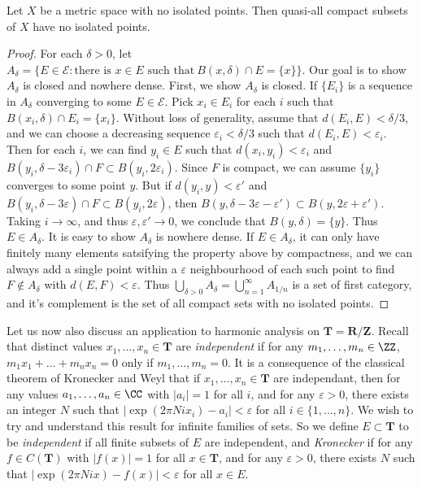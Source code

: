 \begin{theorem}
	Let $X$ be a metric space with no isolated points. Then quasi-all compact subsets of $X$ have no isolated points.
\end{theorem}
\begin{proof}
	For each $\delta > 0$, let $A_\delta = \{ E \in \mathcal{E}: \text{there is $x \in E$ such that}\ B(x,\delta) \cap E = \{ x \} \}$. Our goal is to show $A_\delta$ is closed and nowhere dense. First, we show $A_\delta$ is closed. If $\{ E_i \}$ is a sequence in $A_\delta$ converging to some $E \in \mathcal{E}$. Pick $x_i \in E_i$ for each $i$ such that $B(x_i,\delta) \cap E_i = \{ x_i \}$. Without loss of generality, assume that $d(E_i, E) < \delta / 3$, and we can choose a decreasing sequence $\varepsilon_i < \delta / 3$ such that $d(E_i,E) < \varepsilon_i$. Then for each $i$, we can find $y_i \in E$ such that $d(x_i,y_i) < \varepsilon_i$ and $B(y_i,\delta - 3 \varepsilon_i) \cap F \subset B(y_i,2\varepsilon_i)$. Since $F$ is compact, we can assume $\{ y_i \}$ converges to some point $y$. But if $d(y_i,y) < \varepsilon'$ and $B(y_i,\delta - 3\varepsilon) \cap F \subset B(y_i,2\varepsilon)$, then $B(y,\delta-3\varepsilon - \varepsilon') \subset B(y,2\varepsilon + \varepsilon')$. Taking $i \to \infty$, and thus $\varepsilon, \varepsilon' \to 0$, we conclude that $B(y,\delta) = \{ y \}$. Thus $E \in A_\delta$. It is easy to show $A_\delta$ is nowhere dense. If $E \in A_\delta$, it can only have finitely many elements satsifying the property above by compactness, and we can always add a single point within a $\varepsilon$ neighbourhood of each such point to find $F \not \in A_\delta$ with $d(E,F) < \varepsilon$. Thus $\bigcup_{\delta > 0} A_\delta = \bigcup_{n = 1}^\infty A_{1/n}$ is a set of first category, and it's complement is the set of all compact sets with no isolated points.
\end{proof}

Let us now also discuss an application to harmonic analysis on $\mathbf{T} = \mathbf{R}/\mathbf{Z}$. Recall that distinct values $x_1, \dots, x_n \in \mathbf{T}$ are \emph{independent} if for any $m_1, \dots, m_n \in \ZZ$, $m_1 x_1 + \dots + m_n x_n = 0$ only if $m_1, \dots, m_n = 0$. It is a consequence of the classical theorem of Kronecker and Weyl that if $x_1, \dots, x_n \in \mathbf{T}$ are independant, then for any values $a_1, \dots, a_n \in \CC$ with $|a_i| = 1$ for all $i$, and for any $\varepsilon > 0$, there exists an integer $N$ such that $|\exp(2 \pi Nix_i) - a_i| < \varepsilon$ for all $i \in \{ 1, \dots, n \}$. We wish to try and understand this result for infinite families of sets. So we define $E \subset \mathbf{T}$ to be \emph{independent} if all finite subsets of $E$ are independent, and \emph{Kronecker} if for any $f \in C(\mathbf{T})$ with $|f(x)| = 1$ for all $x \in \mathbf{T}$, and for any $\varepsilon > 0$, there exists $N$ such that $|\exp(2 \pi Nix) - f(x)| < \varepsilon$ for all $x \in E$.

